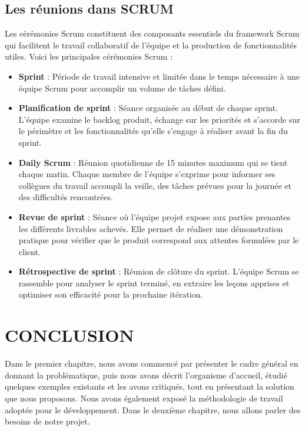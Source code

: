 \subsection{Les réunions dans SCRUM}

\noindent Les cérémonies Scrum constituent des composants essentiels du framework Scrum qui facilitent le travail collaboratif de l'équipe et la production de fonctionnalités utiles. Voici les principales cérémonies Scrum :
\begin{itemize}
    \item \textbf{Sprint} : Période de travail intensive et limitée dans le temps nécessaire à une équipe Scrum pour accomplir un volume de tâches défini.

    \item \textbf{Planification de sprint} : Séance organisée au début de chaque sprint. L'équipe examine le backlog produit, échange sur les priorités et s'accorde sur le périmètre et les fonctionnalités qu'elle s'engage à réaliser avant la fin du sprint.

    \item \textbf{Daily Scrum} : Réunion quotidienne de 15 minutes maximum qui se tient chaque matin. Chaque membre de l'équipe s'exprime pour informer ses collègues du travail accompli la veille, des tâches prévues pour la journée et des difficultés rencontrées.

    \item \textbf{Revue de sprint} : Séance où l'équipe projet expose aux parties prenantes les différents livrables achevés. Elle permet de réaliser une démonstration pratique pour vérifier que le produit correspond aux attentes formulées par le client.

    \item \textbf{Rétrospective de sprint} : Réunion de clôture du sprint. L'équipe Scrum se rassemble pour analyser le sprint terminé, en extraire les leçons apprises et optimiser son efficacité pour la prochaine itération.
\end{itemize}

\section*{CONCLUSION}
 
\noindent Dans le premier chapitre, nous avons commencé par présenter le cadre général en donnant la problématique, puis nous avons décrit l'organisme d'accueil, étudié quelques exemples existants et les avons critiqués, tout en présentant la solution que nous proposons. Nous avons également exposé la méthodologie de travail adoptée pour le développement. Dans le deuxième chapitre, nous allons parler des besoins de notre projet.